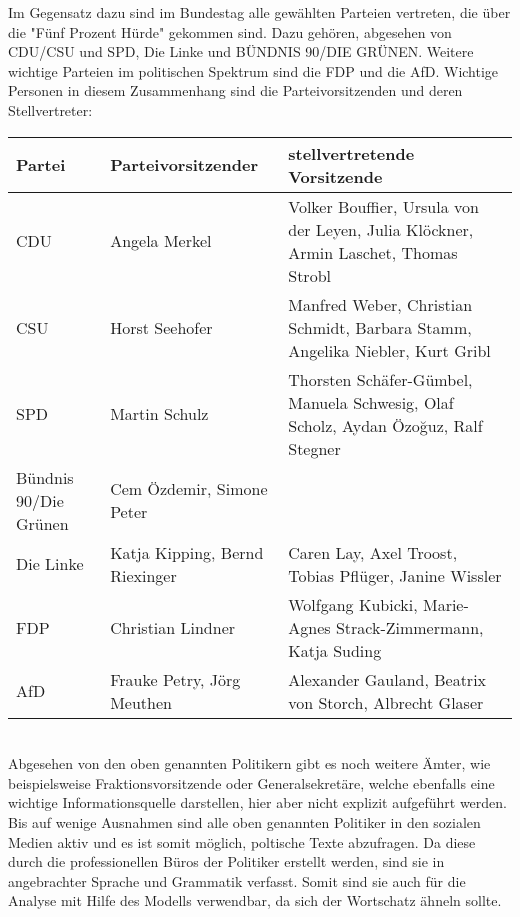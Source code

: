 Im Gegensatz dazu sind im Bundestag alle gewählten Parteien vertreten, die über die "Fünf Prozent Hürde" gekommen sind. Dazu gehören, abgesehen von CDU/CSU und SPD, Die Linke und BÜNDNIS 90/DIE GRÜNEN. Weitere wichtige Parteien im politischen Spektrum sind die FDP und die AfD. Wichtige Personen in diesem Zusammenhang sind die Parteivorsitzenden und deren Stellvertreter: \\
\begin{tabular}{lll}
\hline
Partei & Parteivorsitzender & stellvertretende Vorsitzende \\
\hline
CDU & Angela Merkel & Volker Bouffier, Ursula von der Leyen, Julia Klöckner, Armin Laschet, Thomas Strobl \\
CSU & Horst Seehofer & Manfred Weber, Christian Schmidt, Barbara Stamm, Angelika Niebler, Kurt Gribl \\
SPD & Martin Schulz & Thorsten Schäfer-Gümbel, Manuela Schwesig, Olaf Scholz, Aydan Özoğuz, Ralf Stegner \\
Bündnis 90/Die Grünen & Cem Özdemir, Simone Peter & \\
Die Linke & Katja Kipping, Bernd Riexinger & Caren Lay, Axel Troost, Tobias Pflüger, Janine Wissler \\
FDP & Christian Lindner & Wolfgang Kubicki, Marie-Agnes Strack-Zimmermann, Katja Suding \\
AfD & Frauke Petry, Jörg Meuthen & Alexander Gauland, Beatrix von Storch, Albrecht Glaser \\
\hline
\end{tabular} \\
Abgesehen von den oben genannten Politikern gibt es noch weitere Ämter, wie beispielsweise Fraktionsvorsitzende oder Generalsekretäre, welche ebenfalls eine wichtige Informationsquelle darstellen, hier aber nicht explizit aufgeführt werden. Bis auf wenige Ausnahmen sind alle oben genannten Politiker in den sozialen Medien aktiv und es ist somit möglich, poltische Texte abzufragen. Da diese durch die professionellen Büros der Politiker erstellt werden, sind sie in angebrachter Sprache und Grammatik verfasst. Somit sind sie auch für die Analyse mit Hilfe des Modells verwendbar, da sich der Wortschatz ähneln sollte.

